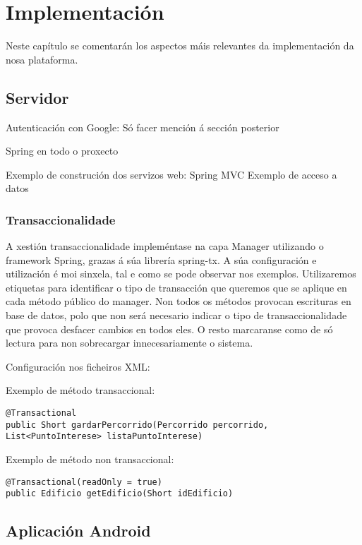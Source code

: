 \chapter{Implementación}

Neste capítulo se comentarán los aspectos máis relevantes da implementación da nosa plataforma.



\section{Servidor}


Autenticación con Google: Só facer mención á sección posterior

Spring en todo o proxecto

Exemplo de construción dos servizos web: Spring MVC
Exemplo de acceso a datos

\subsection{Transaccionalidade}
A xestión transaccionalidade impleméntase na capa Manager utilizando o framework Spring, grazas á súa librería spring-tx. A súa configuración e utilización é moi sinxela, tal e como se pode observar nos exemplos. Utilizaremos etiquetas para identificar o tipo de transacción que queremos que se aplique en cada método público do manager. Non todos os métodos provocan escrituras en base de datos, polo que non será necesario indicar o tipo de transaccionalidade que provoca desfacer cambios en todos eles. O resto marcaranse como de só lectura para non sobrecargar innecesariamente o sistema.

Configuración nos ficheiros XML:

Exemplo de método transaccional:
\begin{lstlisting}
@Transactional
public Short gardarPercorrido(Percorrido percorrido, List<PuntoInterese> listaPuntoInterese)
\end{lstlisting}

Exemplo de método non transaccional:
\begin{lstlisting}
@Transactional(readOnly = true)
public Edificio getEdificio(Short idEdificio)
\end{lstlisting}


\section{Aplicación Android}

